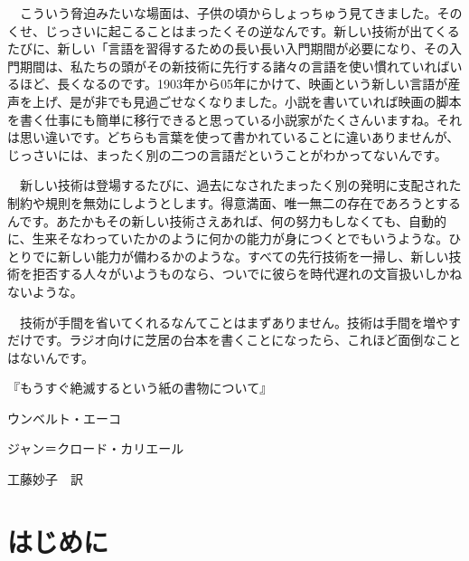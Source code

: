 \documentclass[9pt,b5paper,tombo,openany,dvipdfmx]{jsbook}
\begin{document}
\newpage
\setcounter{page}{1}
\thispagestyle{empty}
\hspace*{1.7in}
\begin{minipage}{0.5\hsize}
	\begin{tiny}
		　こういう脅迫みたいな場面は、子供の頃からしょっちゅう見てきました。そのくせ、じっさいに起こることはまったくその逆なんです。新しい技術が出てくるたびに、新しい「言語を習得するための長い長い入門期間が必要になり、その入門期間は、私たちの頭がその新技術に先行する諸々の言語を使い慣れていればいるほど、長くなるのです。1903年から05年にかけて、映画という新しい言語が産声を上げ、是が非でも見過ごせなくなりました。小説を書いていれば映画の脚本を書く仕事にも簡単に移行できると思っている小説家がたくさんいますね。それは思い違いです。どちらも言葉を使って書かれていることに違いありませんが、じっさいには、まったく別の二つの言語だということがわかってないんです。

		　新しい技術は登場するたびに、過去になされたまったく別の発明に支配された制約や規則を無効にしようとします。得意満面、唯一無二の存在であろうとするんです。あたかもその新しい技術さえあれば、何の努力もしなくても、自動的に、生来そなわっていたかのように何かの能力が身につくとでもいうような。ひとりでに新しい能力が備わるかのような。すべての先行技術を一掃し、新しい技術を拒否する人々がいようものなら、ついでに彼らを時代遅れの文盲扱いしかねないような。

		　技術が手間を省いてくれるなんてことはまずありません。技術は手間を増やすだけです。ラジオ向けに芝居の台本を書くことになったら、これほど面倒なことはないんです。
		\begin{flushright}
			『もうすぐ絶滅するという紙の書物について』

			ウンベルト・エーコ

			ジャン＝クロード・カリエール

			工藤妙子　訳
		\end{flushright}
	\end{tiny}
\end{minipage}

\newpage

\setcounter{page}{1}

\thispagestyle{empty}

\tableofcontents

\chapter{はじめに}
\end{document}

